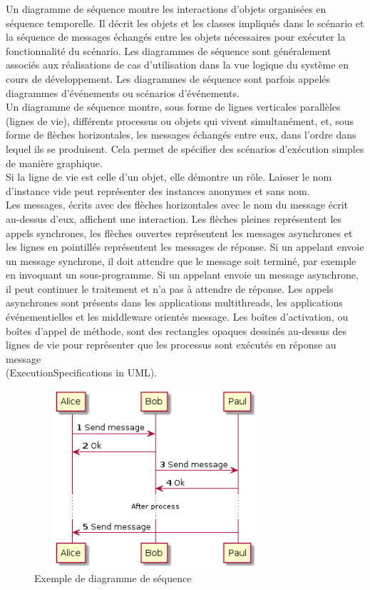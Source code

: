 \documentclass[12pt]{report}
\begin{document}
Un diagramme de séquence montre les interactions d'objets organisées en séquence temporelle. Il décrit les objets et les classes impliqués dans le scénario et la séquence de messages échangés entre les objets nécessaires pour exécuter la fonctionnalité du scénario. Les diagrammes de séquence sont généralement associés aux réalisations de cas d'utilisation dans la vue logique du système en cours de développement. Les diagrammes de séquence sont parfois appelés diagrammes d'événements ou scénarios d'événements.
\\
Un diagramme de séquence montre, sous forme de lignes verticales parallèles (lignes de vie), différents processus ou objets qui vivent simultanément, et, sous forme de flèches horizontales, les messages échangés entre eux, dans l'ordre dans lequel ils se produisent. Cela permet de spécifier des scénarios d'exécution simples de manière graphique.
\\
Si la ligne de vie est celle d'un objet, elle démontre un rôle. Laisser le nom d'instance vide peut représenter des instances anonymes et sans nom.
\\
Les messages, écrits avec des flèches horizontales avec le nom du message écrit au-dessus d'eux, affichent une interaction. Les flèches pleines représentent les appels synchrones, les flèches ouvertes représentent les messages asynchrones et les lignes en pointillés représentent les messages de réponse. Si un appelant envoie un message synchrone, il doit attendre que le message soit terminé, par exemple en invoquant un sous-programme. Si un appelant envoie un message asynchrone, il peut continuer le traitement et n’a pas à attendre de réponse. Les appels asynchrones sont présents dans les applications multithreads, les applications événementielles et les middleware orientés message. Les boîtes d'activation, ou boîtes d'appel de méthode, sont des rectangles opaques dessinés au-dessus des lignes de vie pour représenter que les processus sont exécutés en réponse au message\\ (ExecutionSpecifications in UML).

\vspace{0.2in}

\begin{figure}[h]
\centering
    \centerline{\includegraphics[width = 3.5in, height = 2.6in]{../Images/DiagSeqEX.png}}
    \caption{Exemple de diagramme de séquence}
\end{figure}
\end{document}
